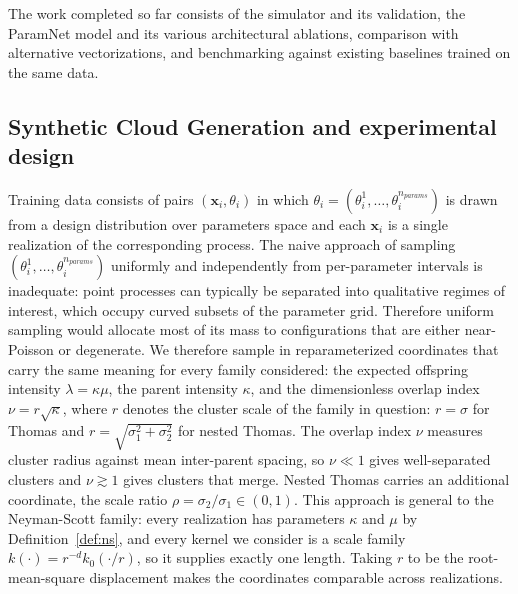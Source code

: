 \documentclass[11pt,a4paper]{article}
\newcommand{\pc}{\mathbf{x}}
\theoremstyle{definitioncolon}
\begin{document}
The work completed so far consists of the simulator and its validation, the
ParamNet model and its various architectural ablations, comparison with alternative
vectorizations, and benchmarking against existing baselines trained on the same
data.

\subsection{Synthetic Cloud Generation and experimental design}
\label{ssec:simulator}

Training data consists of pairs $(\pc_i, \theta_i)$ in which $\theta_i = (\theta_i^1, \dots, \theta_i^{n_{params}})$ is drawn
from a design distribution over parameters space and each $\pc_i$ is a
single realization of the corresponding process.
The naive approach of sampling $(\theta_i^1, \dots, \theta_i^{n_{params}})$ uniformly and
independently from per-parameter intervals is inadequate: point processes can
typically be separated into qualitative regimes of interest, which occupy curved
subsets of the parameter grid.
Therefore uniform sampling would allocate most of
its mass to configurations that are either near-Poisson or degenerate.
We therefore sample in reparameterized coordinates that carry the same meaning
for every family considered:
the expected offspring intensity $\lambda = \kappa\mu$, the parent intensity
$\kappa$, and the dimensionless overlap index $\nu = r\sqrt{\kappa}$,
where $r$ denotes the cluster scale of the family in question: $r = \sigma$ for
Thomas and $r = \sqrt{\sigma_1^2 + \sigma_2^2}$
for nested Thomas. The overlap index $\nu$ measures cluster radius against mean
inter-parent spacing, so $\nu \ll 1$ gives well-separated clusters and
$\nu \gtrsim 1$ gives clusters that merge. Nested Thomas carries an additional
coordinate, the scale ratio $\rho = \sigma_2/\sigma_1 \in (0,1)$.
This approach is general to the Neyman-Scott family: every realization
has parameters $\kappa$ and $\mu$ by Definition~\ref{def:ns}, and every kernel we
consider is a scale family $k(\cdot)=r^{-d}k_0(\cdot/r)$, so it supplies exactly
one length. Taking $r$ to be the root-mean-square displacement makes the
coordinates comparable across realizations.
\end{document}
